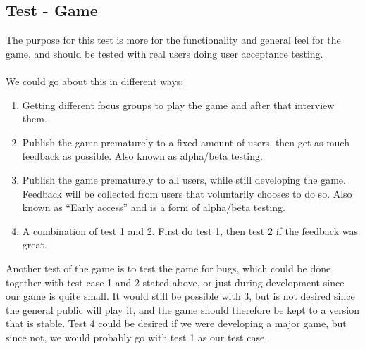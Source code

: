 		\subsection{Test - Game}
The purpose for this test is more for the functionality and general feel for
 the game, and should be tested with real users doing user acceptance testing.
\\
\\
We could go about this in different ways:
	\begin{enumerate}
		\item Getting different focus groups to play the game and after that
    interview them.
		\item Publish the game prematurely to a fixed amount of users, then get
    as much feedback as possible. Also known as alpha/beta testing.
		\item Publish the game prematurely to all users, while still developing
    the game. Feedback will be collected from users that voluntarily chooses
    to do so. Also known as “Early access” and is a form of alpha/beta testing.
		\item A combination of test 1 and 2. First do test 1, then test 2 if the
    feedback was great.
	\end{enumerate}
Another test of the game is to test the game for bugs, which could be done
together with test case 1 and 2 stated above, or just during development since
 our game is quite small. It would still be possible with 3, but is not
 desired since the general public will play it, and the game should therefore
  be kept to a version that is stable. Test 4 could be desired if we were
   developing a major game, but since not, we would probably go with test
    1 as our test case.
